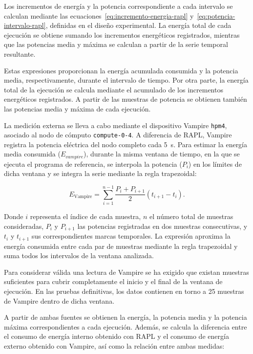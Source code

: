Los incrementos de energía y la potencia correspondiente a cada intervalo se calculan mediante las ecuaciones~\ref{eq:incremento-energia-rapl} y~\ref{eq:potencia-intervalo-rapl}, definidas en el diseño experimental. La energía total de cada ejecución se obtiene sumando los incrementos energéticos registrados, mientras que las potencias media y máxima se calculan a partir de la serie temporal resultante.

Estas expresiones proporcionan la energía acumulada consumida y la potencia media, respectivamente, durante el intervalo de tiempo. Por otra parte, la energía total de la ejecución se calcula mediante el acumulado de los incrementos energéticos registrados. A partir de las muestras de potencia se obtienen también las potencias media y máxima de cada ejecución.

La medición externa se lleva a cabo mediante el dispositivo Vampire \texttt{hpm4}, asociado al nodo de cómputo \texttt{compute-0-4}. A diferencia de RAPL, Vampire registra la potencia eléctrica del nodo completo cada 5~s. Para estimar la energía media consumida ($E_{vampire}$), durante la misma ventana de tiempo, en la que se ejecuta el programa de referencia, se interpola la potencia ($P_i$)  en los límites de dicha ventana y se integra la serie mediante la regla trapezoidal:

\begin{equation}
    E_{\mathrm{Vampire}} =
    \sum_{i=1}^{n-1}
    \frac{P_i+P_{i+1}}{2}
    \left(t_{i+1}-t_i\right).
    \label{eq:vampire-cap6}
\end{equation}

Donde \(i\) representa el índice de cada muestra, \(n\) el número total de muestras consideradas, \(P_i\) y \(P_{i+1}\) las potencias registradas en dos muestras consecutivas, y \(t_i\) y \(t_{i+1}\) sus correspondientes marcas temporales. La expresión aproxima la energía consumida entre cada par de muestras mediante la regla trapezoidal y suma todos los intervalos de la ventana analizada.

Para considerar válida una lectura de Vampire se ha exigido que existan muestras suficientes para cubrir completamente el inicio y el final de la ventana de ejecución. En las pruebas definitivas, los datos contienen en torno a 25 muestras de Vampire dentro de dicha ventana.

A partir de ambas fuentes se obtienen la energía, la potencia media y la potencia máxima correspondientes a cada ejecución. Además, se calcula la diferencia entre el consumo de energía interno obtenido con RAPL y el consumo de energía externo obtenido con Vampire, así como la relación entre ambas medidas:

